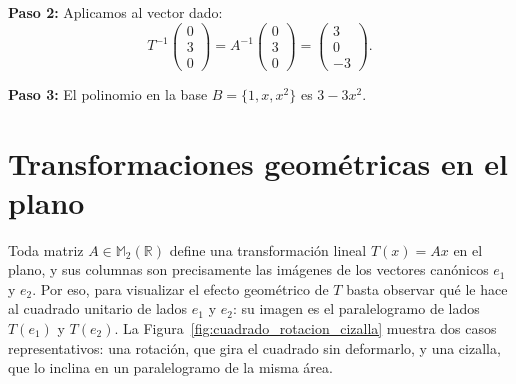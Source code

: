 \begin{example}
\begin{enumerate}[a.]
\begin{myproof}
    \textbf{Paso 2:} Aplicamos al vector dado:
    \[
    T^{-1} \begin{pmatrix} 0 \\ 3 \\ 0 \end{pmatrix}
    = A^{-1} \begin{pmatrix} 0 \\ 3 \\ 0 \end{pmatrix}
    = \begin{pmatrix} 3 \\ 0 \\ -3 \end{pmatrix}.
    \]

    \textbf{Paso 3:} El polinomio en la base $B = \{1, x, x^2\}$ es $\boxed{3 - 3x^2}$.
    \end{myproof}
\end{enumerate}
\end{example}



\section{Transformaciones geométricas en el plano}

Toda matriz $A \in \mathbb{M}_2(\mathbb{R})$ define una transformación lineal $T(x) = Ax$ en el plano, y sus columnas son precisamente las imágenes de los vectores canónicos $e_1$ y $e_2$. Por eso, para visualizar el efecto geométrico de $T$ basta observar qué le hace al cuadrado unitario de lados $e_1$ y $e_2$: su imagen es el paralelogramo de lados $T(e_1)$ y $T(e_2)$. La Figura~\ref{fig:cuadrado_rotacion_cizalla} muestra dos casos representativos: una rotación, que gira el cuadrado sin deformarlo, y una cizalla, que lo inclina en un paralelogramo de la misma área.

